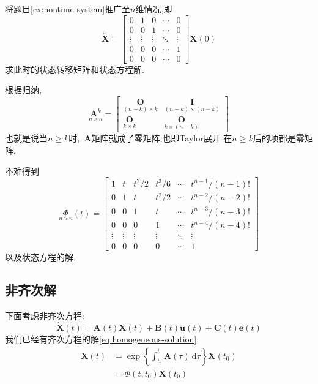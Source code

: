 \documentclass[cn,10pt,citestyle=gb7714-2015,bibstyle=gb7714-2015]{elegantbook}
\newcommand{\md}{\ \mathrm{d}}
\begin{document}
\begin{example}
  将题目\ref{ex:nontime-system}推广至$n$维情况,即
  \[
      \dot{\bm{X}}=\begin{bmatrix}
        0&1&0&\cdots&0\\
        0&0&1&\cdots&0\\
        \vdots&\vdots&\vdots&\ddots&\vdots\\
        0&0&0&\cdots&1\\
        0&0&0&\cdots&0
      \end{bmatrix}\bm{X}(0)
  \]
  求此时的状态转移矩阵和状态方程解.
\end{example}
\begin{solution}
  根据归纳,
  \[
      \underset{n\times n}{\bm{A}^k}=\begin{bmatrix}
        \underset{(n-k)\times k}{\bm{O}}&\underset{(n-k)\times(n-k)}{\bm{I}}\\
        \underset{k\times k}{\bm{O}}&\underset{k\times(n-k)}{\bm{O}}
      \end{bmatrix}
  \]
  也就是说当$n\geqslant k$时,\ $\bm{A}$矩阵就成了零矩阵,也即\textup{Taylor}展开
  在$n\geqslant k$后的项都是零矩阵.

  不难得到
  \[
      \underset{n\times n}{\bm{\varPhi}}(t)=\begin{bmatrix}
        1&t&t^2/2&t^3/6&\cdots&t^{n-1}/(n-1)!\\
        0&1&t&t^2/2&\cdots&t^{n-2}/(n-2)!\\
        0&0&1&t&\cdots&t^{n-3}/(n-3)!\\
        0&0&0&1&\cdots&t^{n-4}/(n-4)!\\
        \vdots&\vdots&\vdots&\vdots&\ddots&\vdots\\
        0&0&0&0&\cdots&1
      \end{bmatrix}
  \]
  以及状态方程的解.
\end{solution}
\subsection{非齐次解}
下面考虑非齐次方程:
\[
    \dot{\bm{X}}(t)=\bm{A}(t)\bm{X}(t)+\bm{B}(t)\bm{u}(t)+\bm{C}(t)\bm{e}(t)
\]
我们已经有齐次方程的解\eqref{eq:homogeneous-solution}:
\begin{align*}
  \bm{X}(t)&=\exp\left\{\int_{t_0}^t\bm{A}(\tau)\md\tau\right\}\bm{X}(t_0)\\
  &=\bm{\varPhi}(t,t_0)\bm{X}(t_0)
\end{align*}
  
\end{document}
